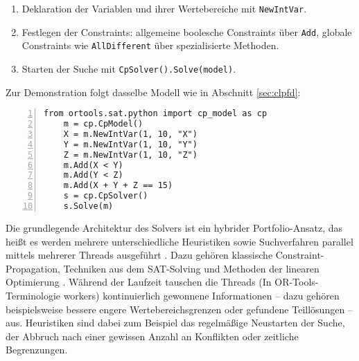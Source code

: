 \documentclass[12pt,a4paper]{article}
\begin{document}
\begin{enumerate}
    \item Deklaration der Variablen und ihrer Wertebereiche mit \texttt{NewIntVar}.
    \item Festlegen der Constraints: allgemeine boolesche Constraints über \texttt{Add}, globale Constraints wie \texttt{AllDifferent} über spezialisierte Methoden.
    \item Starten der Suche mit \texttt{CpSolver().Solve(model)}.
\end{enumerate}

\noindent
Zur Demonstration folgt dasselbe Modell wie in Abschnitt \ref{sec:clpfd}:

\begin{Verbatim}[numbers=left, xleftmargin=5mm, frame=lines]
    from ortools.sat.python import cp_model as cp
    m = cp.CpModel()
    X = m.NewIntVar(1, 10, "X")
    Y = m.NewIntVar(1, 10, "Y")
    Z = m.NewIntVar(1, 10, "Z")
    m.Add(X < Y)
    m.Add(Y < Z)
    m.Add(X + Y + Z == 15)
    s = cp.CpSolver()
    s.Solve(m)
\end{Verbatim}

Die grundlegende Architektur des Solvers ist ein hybrider Portfolio-Ansatz, das heißt es werden mehrere unterschiedliche Heuristiken sowie Suchverfahren parallel mittels mehrerer Threads ausgeführt \cite{perron}.
Dazu gehören klassische Constraint-Propagation, Techniken aus dem SAT-Solving und Methoden der linearen Optimierung \cite{cp-sat-primer}.
Während der Laufzeit tauschen die Threads (In OR-Tools-Terminologie \glqq workers\grqq{}) kontinuierlich gewonnene Informationen -- dazu gehören beispielsweise bessere engere Wertebereichsgrenzen oder gefundene Teillösungen -- aus.
Heuristiken sind dabei zum Beispiel das regelmäßige Neustarten der Suche, der Abbruch nach einer gewissen Anzahl an Konflikten oder zeitliche Begrenzungen.
\end{document}
